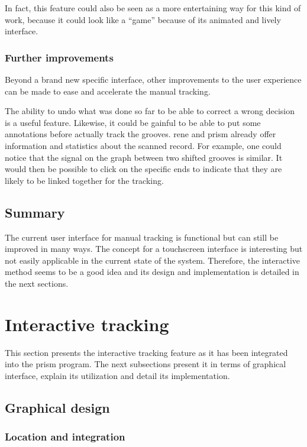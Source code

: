 In fact, this feature could also be seen as a more entertaining way for this kind of work, because it could look like a ``game'' because of its animated and lively interface.

\subsubsection{Further improvements}

Beyond a brand new specific interface, other improvements to the user experience can be made to ease and accelerate the manual tracking.

The ability to undo what was done so far to be able to correct a wrong decision is a useful feature. Likewise, it could be gainful to be able to put some annotations before actually track the grooves. \gls{rene} and \gls{prism} already offer information and statistics about the scanned record. For example, one could notice that the signal on the graph between two shifted grooves is similar. It would then be possible to click on the specific ends to indicate that they are likely to be linked together for the tracking.

\subsection{Summary}

The current user interface for manual tracking is functional but can still be improved in many ways. The concept for a touchscreen interface is interesting but not easily applicable in the current state of the system. Therefore, the interactive method seems to be a good idea and its design and implementation is detailed in the next sections.

\section{Interactive tracking}

This section presents the interactive tracking feature as it has been integrated into the \gls{prism} program. The next subsections present it in terms of graphical interface, explain its utilization and detail its implementation.

\subsection{Graphical design}

\subsubsection{Location and integration}

